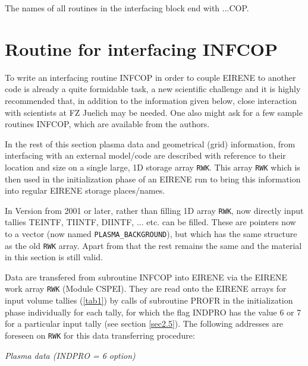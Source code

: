 The names of all routines in the interfacing block
end with ...COP.

\section{Routine for interfacing INFCOP} \label{sec4.1}


To write an interfacing routine INFCOP
in order to couple EIRENE to
another code is already a quite formidable task, a new scientific challenge and it is highly
recommended that, in addition to the information given below,
close interaction with scientists at FZ Juelich may be needed. One also might
ask for a few sample routines INFCOP, which are available from
the authors.

In the rest of this section plasma data and geometrical (grid) information, from interfacing with an external model/code are
described with reference to their location and size on a single large, 1D storage array \texttt{RWK}.
This array \texttt{RWK} which is then used in the initialization phase of an EIRENE run to bring this information into
regular EIRENE storage places/names.

In Version from 2001 or later, rather than filling 1D array \texttt{RWK}, now directly
input tallies TEINTF, TIINTF, DIINTF, ... etc. can be filled. These are pointers now to a vector (now named
\texttt{PLASMA\_BACKGROUND}), but which has the same structure as the old \texttt{RWK} array. Apart from that the rest remains the same
and the material in this section is still valid.

Data are transfered from subroutine INFCOP into EIRENE via the
EIRENE work array \texttt{RWK}  (Module CSPEI).
They are read onto the EIRENE arrays for input volume tallies (\ref{tab1}) by calls of subroutine PROFR in
the initialization phase individually for each tally,
for which the flag INDPRO has the value 6 or 7 for a particular input tally
(see section \ref{sec2.5}).
The following addresses are foreseen on \texttt{RWK} for this data transferring
procedure:


{\sl Plasma data (INDPRO = 6 option) }

